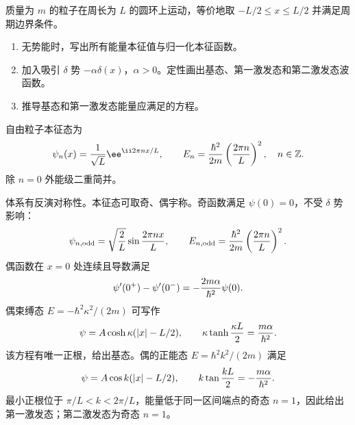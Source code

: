 
\begin{question}
质量为 $m$ 的粒子在周长为 $L$ 的圆环上运动，等价地取 $-L/2\le x\le L/2$ 并满足周期边界条件。
\begin{enumerate}
  \item 无势能时，写出所有能量本征值与归一化本征函数。
  \item 加入吸引 $\delta$ 势 $-\alpha\delta(x)$，$\alpha>0$。定性画出基态、第一激发态和第二激发态波函数。
  \item 推导基态和第一激发态能量应满足的方程。
\end{enumerate}
\begin{solution}
自由粒子本征态为
\[
  \psi_n(x)={1\over\sqrt L}\ee^{\ii 2\pi n x/L},\qquad
  E_n={\hbar^2\over2m}\left({2\pi n\over L}\right)^2,\quad n\in\mathbb Z .
\]
除 $n=0$ 外能级二重简并。

体系有反演对称性。本征态可取奇、偶宇称。奇函数满足 $\psi(0)=0$，不受 $\delta$ 势影响：
\[
  \psi_{n,\mathrm{odd}}=\sqrt{2\over L}\sin {2\pi n x\over L},
  \qquad E_{n,\mathrm{odd}}={\hbar^2\over2m}\left({2\pi n\over L}\right)^2 .
\]
偶函数在 $x=0$ 处连续且导数满足
\[
  \psi'(0^+)-\psi'(0^-)=-{2m\alpha\over\hbar^2}\psi(0) .
\]
偶束缚态 $E=-\hbar^2\kappa^2/(2m)$ 可写作
\[
  \psi=A\cosh\kappa(|x|-L/2),
  \qquad \kappa\tanh{\kappa L\over2}={m\alpha\over\hbar^2}.
\]
该方程有唯一正根，给出基态。偶的正能态 $E=\hbar^2k^2/(2m)$ 满足
\[
  \psi=A\cos k(|x|-L/2),
  \qquad k\tan{kL\over2}=-{m\alpha\over\hbar^2}.
\]
最小正根位于 $\pi/L<k<2\pi/L$，能量低于同一区间端点的奇态
$n=1$，因此给出第一激发态；第二激发态为奇态 $n=1$。
\end{solution}
\end{question}


